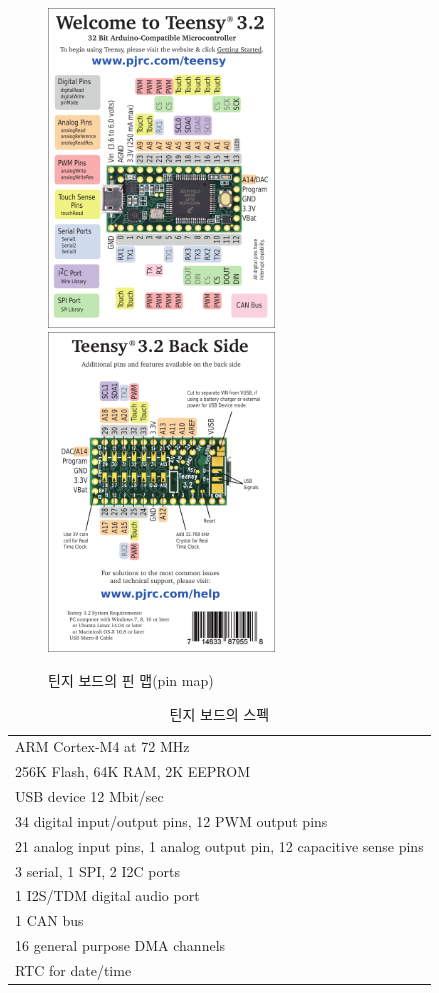 \begin{figure}[H]
    \centering
    \includegraphics[width=6cm]{images/Teensy3.2 - 1.pdf}
    \includegraphics[width=6cm]{images/Teensy3.2 - 2.pdf}
    \caption{틴지 보드의 핀 맵(pin map)}
    \label{fig:enter-label}
\end{figure}


\begin{table}[H]
    \centering
    \caption{틴지 보드의 스펙}
    \begin{tabular}{l}
        \hline
        ARM Cortex-M4 at 72 MHz\\
        256K Flash, 64K RAM, 2K EEPROM\\
        USB device 12 Mbit/sec\\
        34 digital input/output pins, 12 PWM output pins\\
        21 analog input pins, 1 analog output pin, 12 capacitive sense pins\\
        3 serial, 1 SPI, 2 I2C ports\\
        1 I2S/TDM digital audio port\\
        1 CAN bus\\
        16 general purpose DMA channels\\
        RTC for date/time\\
        \hline
    \end{tabular}
    \label{Specification of Teensy Board}
\end{table}



